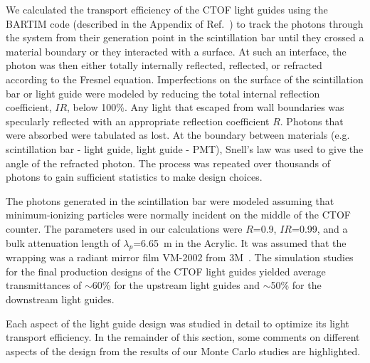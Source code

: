 \documentclass{elsart}
\begin{document}
We calculated the transport efficiency of the CTOF light guides using the BARTIM code
(described in the Appendix of Ref.~\cite{mutch}) to track the photons through the system
from their generation point in the scintillation bar until they crossed a material boundary
or they interacted with a surface. At such an interface, the photon was then either totally 
internally reflected, reflected, or refracted according to the Fresnel equation. Imperfections 
on the surface of the scintillation bar or light guide were modeled by reducing the total 
internal reflection coefficient, $IR$, below 100\%. Any light that escaped from wall boundaries 
was specularly reflected with an appropriate reflection coefficient $R$. Photons that were 
absorbed were tabulated as lost. At the boundary between materials (e.g. scintillation bar - 
light guide, light guide - PMT), Snell's law was used to give the angle of the refracted 
photon. The process was repeated over thousands of photons to gain sufficient statistics to 
make design choices.

The photons generated in the scintillation bar were modeled assuming that minimum-ionizing
particles were normally incident on the middle of the CTOF counter. The parameters used in our 
calculations were $R$=0.9, $IR$=0.99, and a bulk attenuation length of $\lambda_p$=6.65~m 
in the Acrylic. It was assumed that the wrapping was a radiant mirror film VM-2002 from 
3M~\cite{3m-ref}. The simulation studies for the final production designs of the CTOF light
guides yielded average transmittances of $\sim$60\% for the upstream light guides and
$\sim$50\% for the downstream light guides.

Each aspect of the light guide design was studied in detail to optimize its light transport 
efficiency. In the remainder of this section, some comments on different aspects of the 
design from the results of our Monte Carlo studies are highlighted.
\end{document}
